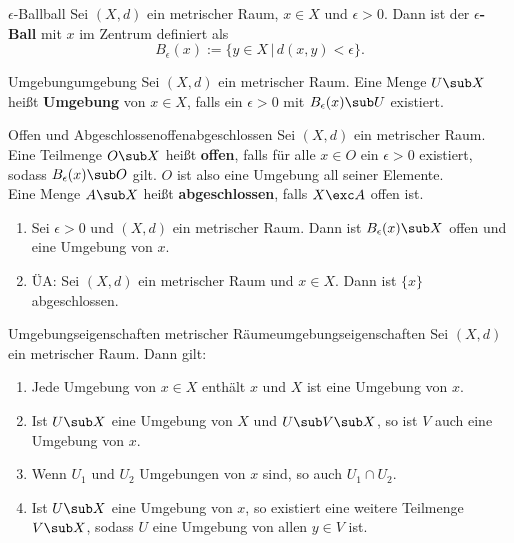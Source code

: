 \begin{definition}{$\epsilon$-Ball}{ball}
Sei $(X,d)$ ein metrischer Raum, $x \in X$ und $\epsilon > 0$. Dann ist der $\epsilon$\textbf{-Ball} mit $x$ im Zentrum definiert als 
\begin{equation}
B_\epsilon (x) := \{ y \in X \, | \, d(x,y) < \epsilon \}.
\end{equation}
\end{definition}
\begin{definition}{Umgebung}{umgebung}
Sei $(X,d)$ ein metrischer Raum. Eine Menge $U \sub X$ heißt \textbf{Umgebung} von $x \in X$, falls ein $\epsilon > 0$ mit $B_\epsilon (x) \sub U$ existiert.
\end{definition}
\begin{definition}{Offen und Abgeschlossen}{offenabgeschlossen}
Sei $(X,d)$ ein metrischer Raum. Eine Teilmenge $O \sub X$ heißt \textbf{offen}, falls für alle $x \in O$ ein $\epsilon > 0$ existiert, sodass $B_\epsilon (x) \sub O$ gilt. $O$ ist also eine Umgebung all seiner Elemente.\\
Eine Menge $A \sub X$ heißt \textbf{abgeschlossen}, falls $X \exc A$ offen ist.
\end{definition}
\begin{bemerkungen}
\begin{enumerate}
\item Sei $\epsilon > 0$ und $(X,d)$ ein metrischer Raum. Dann ist $B_\epsilon (x) \sub X$ offen und eine Umgebung von $x$.
\item ÜA: Sei $(X,d)$ ein metrischer Raum und $x \in X$. Dann ist $\{x\}$ abgeschlossen.
\end{enumerate}
\end{bemerkungen}
\begin{satz}{Umgebungseigenschaften metrischer Räume}{umgebungseigenschaften}
Sei $(X,d)$ ein metrischer Raum. Dann gilt:
\begin{enumerate}
\item Jede Umgebung von $x \in X$ enthält $x$ und $X$ ist eine Umgebung von $x$.
\item Ist $U \sub X$ eine Umgebung von $X$ und $U \sub V \sub X$, so ist $V$ auch eine Umgebung von $x$.
\item Wenn $U_1$ und $U_2$ Umgebungen von $x$ sind, so auch $U_1 \cap U_2$.
\item Ist $U \sub X$ eine Umgebung von $x$, so existiert eine weitere Teilmenge $V \sub X$, sodass $U$ eine Umgebung von allen $y \in V$ ist.
\end{enumerate}
\end{satz}
